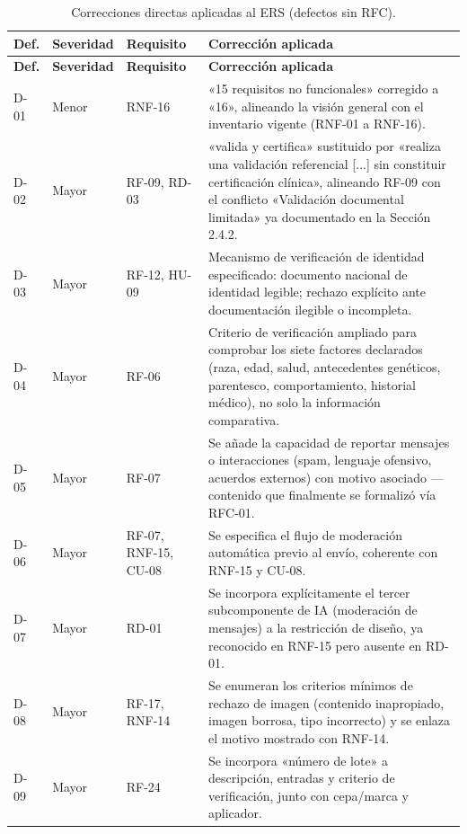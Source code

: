 \documentclass[11pt]{article}
\begin{document}
	\begin{longtable}{C{1.2cm} L{1.7cm} L{2.5cm} L{7cm}}
		\caption{Correcciones directas aplicadas al ERS (defectos sin RFC).}\label{tab:correcciones-directas}\\
		\toprule
		\textbf{Def.} & \textbf{Severidad} & \textbf{Requisito} & \textbf{Corrección aplicada} \\
		\midrule
		\endfirsthead
		\toprule
		\textbf{Def.} & \textbf{Severidad} & \textbf{Requisito} & \textbf{Corrección aplicada} \\
		\midrule
		\endhead
		\bottomrule
		\endfoot
		D-01 & Menor & RNF-16 & «15 requisitos no funcionales» corregido a «16», alineando la visión general con el inventario vigente (RNF-01 a RNF-16). \\
		\addlinespace
		D-02 & Mayor & RF-09, RD-03 & «valida y certifica» sustituido por «realiza una validación referencial [...] sin constituir certificación clínica», alineando RF-09 con el conflicto «Validación documental limitada» ya documentado en la Sección 2.4.2. \\
		\addlinespace
		D-03 & Mayor & RF-12, HU-09 & Mecanismo de verificación de identidad especificado: documento nacional de identidad legible; rechazo explícito ante documentación ilegible o incompleta. \\
		\addlinespace
		D-04 & Mayor & RF-06 & Criterio de verificación ampliado para comprobar los siete factores declarados (raza, edad, salud, antecedentes genéticos, parentesco, comportamiento, historial médico), no solo la información comparativa. \\
		\addlinespace
		D-05 & Mayor & RF-07 & Se añade la capacidad de reportar mensajes o interacciones (spam, lenguaje ofensivo, acuerdos externos) con motivo asociado --- contenido que finalmente se formalizó vía RFC-01. \\
		\addlinespace
		D-06 & Mayor & RF-07, RNF-15, CU-08 & Se especifica el flujo de moderación automática previo al envío, coherente con RNF-15 y CU-08. \\
		\addlinespace
		D-07 & Mayor & RD-01 & Se incorpora explícitamente el tercer subcomponente de IA (moderación de mensajes) a la restricción de diseño, ya reconocido en RNF-15 pero ausente en RD-01. \\
		\addlinespace
		D-08 & Mayor & RF-17, RNF-14 & Se enumeran los criterios mínimos de rechazo de imagen (contenido inapropiado, imagen borrosa, tipo incorrecto) y se enlaza el motivo mostrado con RNF-14. \\
		\addlinespace
		D-09 & Mayor & RF-24 & Se incorpora «número de lote» a descripción, entradas y criterio de verificación, junto con cepa/marca y aplicador. \\

\end{longtable}
\end{document}
